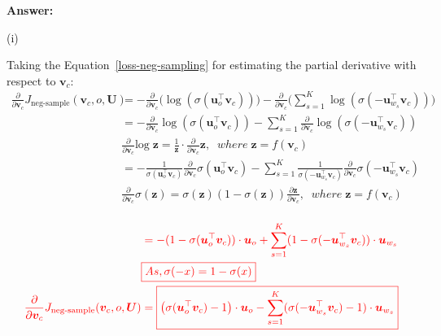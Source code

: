 \documentclass{article}
\newenvironment{answer}{
    {\bf Answer:} \sf \begingroup\color{red}
}{\endgroup}%
\begin{document}
\begin{enumerate}[label=(\alph*)]
\begin{shaded}
\begin{answer}

(i)

Taking the Equation~\ref{loss-neg-sampling} for estimating the partial derivative with respect to $\bm v_c$: 
\begin{equation*}
\begin{split}
\frac{\partial}{\partial \bm v_c} J_{\text{neg-sample}}(\bm v_c, o, \bm U) & = -\frac{\partial}{\partial \bm v_c} \Big(\log(\sigma(\bm u_o^\top \bm v_c))\Big) - \frac{\partial}{\partial \bm v_c} \Bigg(\sum_{s=1}^K \log(\sigma(-\bm u_{w_s}^\top \bm v_c))\Bigg)\\
& = -\frac{\partial}{\partial \bm v_c} \log(\sigma(\bm u_o^\top \bm v_c)) - \sum_{s=1}^K \frac{\partial}{\partial \bm v_c} \log(\sigma(-\bm u_{w_s}^\top \bm v_c))\\
& \boxed{ \frac{\partial}{\partial \bm v_c} \text{log} \;\bm z = \frac{1}{\bm z} \cdot \frac{\partial}{\partial \bm v_c} \bm z , \;\; where \; \bm z = f(\bm v_c)}\\
& = -\frac{1}{\sigma(\bm u_o^\top \bm v_c)} \frac{\partial}{\partial \bm v_c} \sigma(\bm u_o^\top \bm v_c) - \sum_{s=1}^K \frac{1}{\sigma(-\bm u_{w_s}^\top \bm v_c)} \frac{\partial}{\partial \bm v_c} \sigma(-\bm u_{w_s}^\top \bm v_c)\\
& \boxed{\frac{\partial}{\partial \bm v_c} \sigma (\bm z)= \sigma(\bm z)(1-\sigma(\bm z)) \frac{\partial \bm z}{\partial \bm v_c} , \;\; where \; \bm z = f(\bm v_c)}\\
\end{split}
\end{equation*}


\begin{equation*}
\color{red}
\begin{split}
& = - (1-\sigma(\bm u_o^\top \bm v_c)) \cdot \bm u_o + \sum_{s=1}^K (1 - \sigma(-\bm u_{w_s}^\top \bm v_c)) \cdot \bm u_{w_s}\\
& \boxed{As, \sigma(-x)=1-\sigma(x)}\\
\frac{\partial}{\partial \bm v_c} J_{\text{neg-sample}}(\bm v_c, o, \bm U) & =  \boxed{\big(\sigma(\bm u_o^\top \bm v_c) -1 \big) \cdot \bm u_o - \sum_{s=1}^K (\sigma(-\bm u_{w_s}^\top \bm v_c) - 1) \cdot \bm u_{w_s}}\\
\end{split}
\end{equation*}

\color{red}


\end{answer}
\end{shaded}
\end{enumerate}
\end{document}
